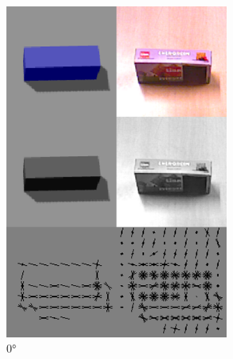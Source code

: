 \documentclass[letterpaper, 10 pt, conference]{conf/ieeeconf}  %
\begin{document}
\begin{figure}[H]
  \centering
  \begin{subfigure}[b]{0.238\textwidth}
    \centering
    \includegraphics[width=0.8\textwidth]{simulation_vs_real_world_base_case.png}
    \caption{\label{fig:simulation_vs_real_world_0}\ang{0}}
  \end{subfigure}
  \begin{subfigure}[b]{0.238\textwidth}
    \centering

\end{subfigure}
\end{figure}
\end{document}
